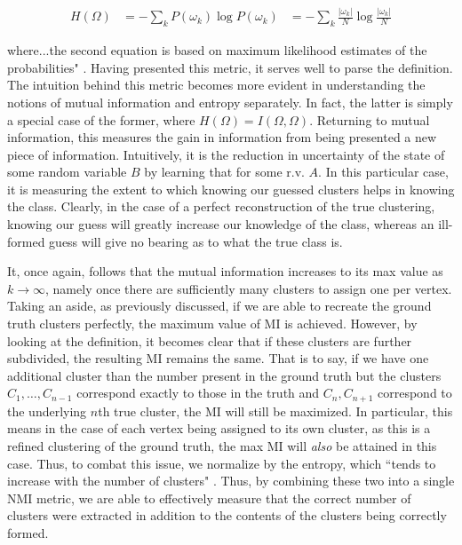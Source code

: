 \documentclass[journal]{IEEEtran}
\begin{document}
\begin{align}
H(\Omega) &= -\sum_k P(\omega_k) \log P(\omega_k)
&= -\sum_k \frac{\vert\omega_k\vert}{N} \log \frac{\vert\omega_k\vert}{N}
\end{align}

where...the second equation is based on maximum likelihood estimates of the probabilities" \cite{evaluation}. Having presented this metric, it serves well to parse the definition. The intuition behind this metric becomes more evident in understanding the notions of mutual information and entropy separately. In fact, the latter is simply a special case of the former, where $H(\Omega) = I(\Omega,\Omega)$. Returning to mutual information, this measures the gain in information from being presented a new piece of information. Intuitively, it is the reduction in uncertainty of the state of some random variable $B$ by learning that for some r.v. $A$. In this particular case, it is measuring the extent to which knowing our guessed clusters helps in knowing the class. Clearly, in the case of a perfect reconstruction of the true clustering, knowing our guess will greatly increase our knowledge of the class, whereas an ill-formed guess will give no bearing as to what the true class is.

It, once again, follows that the mutual information increases to its max value as $k\rightarrow\infty$, namely once there are sufficiently many clusters to assign one per vertex. Taking an aside, as previously discussed, if we are able to recreate the ground truth clusters perfectly, the maximum value of MI is achieved. However, by looking at the definition, it becomes clear that if these clusters are further subdivided, the resulting MI remains the same. That is to say, if we have one additional cluster than the number present in the ground truth but the clusters $C_1,\dots,C_{n-1}$ correspond exactly to those in the truth and $C_n,C_{n+1}$ correspond to the underlying $n$th true cluster, the MI will still be maximized. In particular, this means in the case of each vertex being assigned to its own cluster, as this is a refined clustering of the ground truth, the max MI will \textit{also} be attained in this case. Thus, to combat this issue, we normalize by the entropy, which ``tends to increase with the number of clusters" \cite{evaluation}. Thus, by combining these two into a single NMI metric, we are able to effectively measure that the correct number of clusters were extracted in addition to the contents of the clusters being correctly formed.
\end{document}
